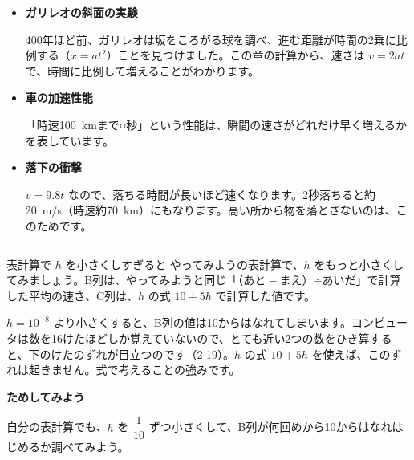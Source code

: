 \begin{butsuri}
\begin{itemize}[leftmargin=1.2\zw, itemsep=2pt, topsep=0pt, label={\color{bkPurple}●}]
\item \textbf{ガリレオの斜面の実験}\par
400年ほど前、ガリレオは坂をころがる球を調べ、進む距離が時間の2乗に比例する（$x=at^2$）ことを見つけました。この章の計算から、速さは $v=2at$ で、時間に比例して増えることがわかります。
\item \textbf{車の加速性能}\par
「時速\qty{100}{km}まで○秒」という性能は、瞬間の速さがどれだけ早く増えるかを表しています。
\item \textbf{落下の衝撃}\par
$v=9.8t$ なので、落ちる時間が長いほど速くなります。2秒落ちると約\qty{20}{m/s}（時速約\qty{70}{km}）にもなります。高い所から物を落とさないのは、このためです。
\end{itemize}
\end{butsuri}

\begin{column}{表計算で $h$ を小さくしすぎると}
やってみようの表計算で、$h$ をもっと小さくしてみましょう。B列は、やってみようと同じ「（あと${}-{}$まえ）÷あいだ」で計算した平均の速さ、C列は、$h$ の式 $10+5h$ で計算した値です。
\begin{bkcenter}
\end{bkcenter}
$h=10^{-8}$ より小さくすると、B列の値は10からはなれてしまいます。コンピュータは数を16けたほどしか覚えていないので、とても近い2つの数をひき算すると、下のけたのずれが目立つのです（2-19）。$h$ の式 $10+5h$ を使えば、このずれは起きません。式で考えることの強みです。\par\vspace{4pt}
\textbf{ためしてみよう}\par
自分の表計算でも、$h$ を $\dfrac{1}{10}$ ずつ小さくして、B列が何回めから10からはなれはじめるか調べてみよう。
\end{column}

